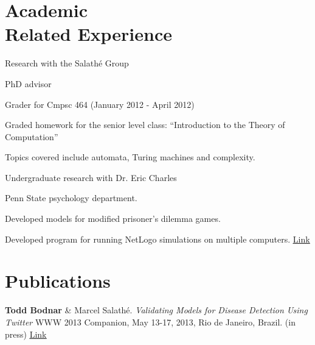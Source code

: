\documentclass[margin,line]{res}
\newcommand{\linkToUrl}[1]{\underline{\color{blue} \href{#1}{Link}}}
\newenvironment{list1}{
  \begin{list}{\ding{113}}{%
      \setlength{\itemsep}{0in}
      \setlength{\parsep}{0in} \setlength{\parskip}{0in}
      \setlength{\topsep}{0in} \setlength{\partopsep}{0in} 
      \setlength{\leftmargin}{0.17in}}}{\end{list}}
\begin{document}
\begin{resume}
\section{\sc Academic \\Related Experience}
Research with the Salath\'e Group%
\begin{list1}
\item[] PhD advisor
\end{list1}
Grader for Cmpsc 464 (January 2012 - April 2012)
\begin{list1}
\item[] Graded homework for the senior level class: ``Introduction to the Theory of Computation''
\item[] Topics covered include automata, Turing machines and complexity.
\end{list1}
Undergraduate research with Dr. Eric Charles%
\begin{list1}
\item[] Penn State psychology department.
\item[] Developed models for modified prisoner's dilemma games.
\item[] Developed program for running NetLogo simulations on multiple computers. \linkToUrl{http://bit.ly/12UQ4cq}
\end{list1}




\section{\sc Publications}

\begin{etaremune}[start=3]
\item \textbf{Todd Bodnar} \& Marcel Salath\'e. \textit{Validating Models for Disease Detection Using Twitter}  WWW 2013 Companion, May 13-17, 2013, Rio de Janeiro, Brazil. (in press) \linkToUrl{http://bit.ly/WWL1Gr}


\end{etaremune}
\end{resume}
\end{document}
